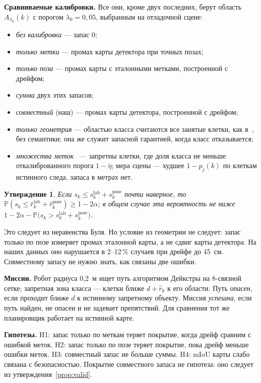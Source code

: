 \documentclass[conference,a4paper]{IEEEtran}
\newtheorem{proposition}{Утверждение}
\theoremstyle{definition}
\begin{document}
\textbf{Сравниваемые калибровки.} Все они, кроме двух последних, берут область $A_{\lambda_0}(k)$ с порогом
$\lambda_0 = 0{,}05$, выбранным на отладочной сцене:
\begin{itemize}
  \item \emph{без калибровки} --- запас 0;
  \item \emph{только метки} --- промах карты детектора при точных позах;
  \item \emph{только поза} --- промах карты с эталонными метками, построенной с дрейфом;
  \item \emph{сумма} двух этих запасов;
  \item \emph{совместный} (наш) --- промах карты детектора, построенной с дрейфом;
  \item \emph{только геометрия} --- областью класса считаются все занятые клетки, как в~\cite{pwc}, без семантики; она же
  служит запасной гарантией, когда класс отказывается;
  \item \emph{множества меток}~\cite{sundarsingh} --- запретны клетки, где доля класса не меньше откалиброванного порога
  $1 - \hat\eta$; мера сцены --- худшее $1 - p_j(k)$ по клеткам истинного следа, запаса в метрах нет.
\end{itemize}

\begin{proposition}\label{prop:sep}
Если $s_k \le s^{\mathrm{lab}}_k + s^{\mathrm{pose}}_k$ почти наверное, то
$\mathbb P(s_k \le \hat r^{\mathrm{lab}}_k + \hat r^{\mathrm{pose}}_k) \ge 1 - 2\alpha$; в общем случае эта вероятность
не ниже $1 - 2\alpha - \mathbb P\bigl(s_k > s^{\mathrm{lab}}_k + s^{\mathrm{pose}}_k\bigr)$.
\end{proposition}

Это следует из неравенства Буля. Но условие из геометрии не следует: запас только по позе измеряет промах эталонной карты, а
не сдвиг карты детектора. На наших данных оно нарушается в 2--12\,\% случаев при дрейфе до 45~см. Совместному запасу
не нужно знать, как связаны две ошибки.

\textbf{Миссии.} Робот радиуса 0,2~м ищет путь алгоритмом Дейкстры на 8-связной сетке; запретная зона класса ---
клетки ближе $d + \hat r_k$ к его области. Путь \emph{опасен}, если проходит ближе $d$ к истинному запретному объекту.
Миссия \emph{успешна}, если путь найден, не опасен и не задевает препятствий. Для сравнения тот же планировщик работает
на истинной карте.

\textbf{Гипотезы.} H1: запас только по меткам теряет покрытие, когда дрейф сравним с ошибкой меток. H2: запас только по
позе теряет покрытие, пока дрейф меньше ошибки меток. H3: совместный запас не больше суммы. H4: mIoU карты слабо связана
с безопасностью. Покрытие совместного запаса не гипотеза: оно следует из утверждения~\ref{prop:valid}.
\end{document}
